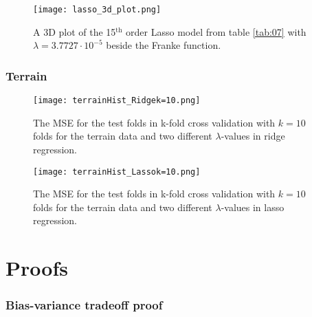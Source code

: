 \documentclass[uio,jmp,amsmath,amssymb,reprint,nofootinbib]{revtex4-1}
\numberwithin{equation}{section}
\begin{document}
\begin{figure}[H]
    \centering
    \texttt{[image: lasso\_3d\_plot.png]}
    \caption{A 3D plot of the 15\(^\text{th}\) order Lasso model from table \ref{tab:07} with \(\lambda = 3.7727\cdot 10^{-5}\) beside the Franke function.}
    \label{fig:lasso_3d}
\end{figure}

\subsubsection{Terrain}

\begin{figure}[H]
    \centering
    \texttt{[image: terrainHist\_Ridgek=10.png]}
    \caption{The MSE for the test folds in k-fold cross validation with \(k=10\) folds for the terrain data and two different \(\lambda\)-values in ridge regression.}
    \label{fig:hist_terrain_ridge}
\end{figure}

\begin{figure}[H]
    \centering
    \texttt{[image: terrainHist\_Lassok=10.png]}
    \caption{The MSE for the test folds in k-fold cross validation with \(k=10\) folds for the terrain data and two different \(\lambda\)-values in lasso regression.}
    \label{fig:hist_terrain_lasso}
\end{figure}

\onecolumngrid
\section{Proofs}\label{sec:proof}

\subsubsection{Bias-variance tradeoff proof}
\end{document}
